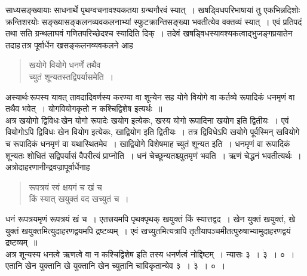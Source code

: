 \documentclass[11pt, openany]{book}
\begin{document}
\noindent साध्यसङ्ख्यायाः साधनार्थे पृथग्वचनावश्यकतया ग्रन्थगौरवं स्यात्~।
खषड्विधपरिभाषायां तु एकभिन्नदिशोः क्रन्तिशरयोः सङ्ख्यासङ्कलनव्यवकलनाभ्यां 
स्फुटक्रान्तिसङ्ख्या भवतीत्येव वक्तव्यं स्यात्~। एवं प्रतिपदं तथा सति
ग्रन्थलाघवं गणितपरिच्छेदश्च स्यादिति दिक्~। तदेवं खषड्विधस्यावश्यकत्वाद्भुजङ्गप्रयातेन तदाह\textendash \,तत्र पूर्वार्धेन खसङ्कलनव्यवकलने
आह\textendash  
\begin{quote}
    \bs
    खयोगे वियोगे धनर्णे तथैव \\
 
 \vspace{-7mm}
\hspace{1cm} च्युतं शून्यतस्तद्विपर्यासमेति~। 

\end{quote}
 
 अस्यार्थः\textendash \,रूपस्य यावत् तावदादिवर्णस्य करण्या वा शून्येन सह योगे वियोगे वा कर्तव्ये रूपादिकं धनमृणं वा तथैव भवेत्~। योगवियोगकृतो न कश्चिद्विशेष इत्यर्थः~॥ \\

\vspace{-3mm}
 अत्र खयोगो द्विविधः\textendash \,खेन योगो रूपादेः खयोग इत्येकः, 
खस्य योगो रूपादिना खयोग इति द्वितीयः~। एवं वियोगोऽपि द्विविधः 
खेन वियोग इत्येकः, खाद्वियोग इति द्वितीयः~। तत्र द्विविधेऽपि खयोगे 
पूर्वस्मिन् खवियोगे च रूपादिकं धनमृणं वा यथास्थितमेव~। खाद्वियोगे 
विशेषमाह च्युतं शून्यत इति~। धनमृणं वा रूपादिकं शून्यतः शोधितं 
सद्विपर्यासं वैपरीत्यं प्राप्नोति~। धनं चेच्छून्यतश्च्युतमृणं भवति~। ऋणं 
चेद्धनं भवतीत्यर्थः~। अत्रोदाहरणानीन्द्रवज्रापूर्वार्धेनाह\textendash  
\begin{quote}
    \ex
     रूपत्रयं स्वं क्षयगं च खं च \\

\vspace{-7mm}
 \hspace{1cm} किं स्यात् खयुक्तं वद खच्युतं च~। 
\end{quote}

 धनं रूपत्रयमृणं रूपत्रयं खं च~। एतत्त्रयमपि पृथक्पृथक् खयुक्तं 
किं स्यात्तद्वद~। खेन युक्तं खयुक्तं, खे युक्तं खयुक्तमित्युदाहरणद्वयमपि
द्रष्टव्यम्~। एवं खच्युतमित्यत्रापि
तृतीयापञ्चमीतत्पुरुषाभ्यामुदाहरणद्वयं द्रष्टव्यम्~॥ \\
 
 \vspace{-3mm}
 अत्र शून्यस्य धनत्वे ऋणत्वे वा न कश्चिद्विशेष इति तस्य 
धनर्णत्वं नोद्दिष्टम्~। न्यासः ३~। $\dot{\text{३}}$~। ०~। एतानि खेन युक्तानि खे युक्तानि खेन च्युतानि चाविकृतान्येव ३~। $\dot{\text{३}}$~। ०~।
\newpage
\end{document}
